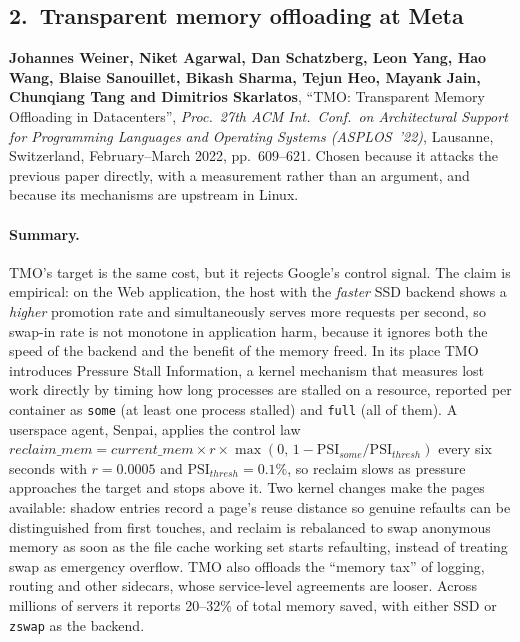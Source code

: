 \subsection*{2.~Transparent memory offloading at Meta}

\noindent\textbf{Johannes Weiner, Niket Agarwal, Dan Schatzberg, Leon Yang, Hao Wang,
Blaise Sanouillet, Bikash Sharma, Tejun Heo, Mayank Jain, Chunqiang Tang and Dimitrios
Skarlatos}, ``TMO: Transparent Memory Offloading in Datacenters'', \emph{Proc.\ 27th
ACM Int.\ Conf.\ on Architectural Support for Programming Languages and Operating
Systems (ASPLOS~'22)}, Lausanne, Switzerland, February--March 2022, pp.~609--621.
Chosen because it attacks the previous paper directly, with a measurement rather than an
argument, and because its mechanisms are upstream in Linux.

\paragraph{Summary.}
TMO's target is the same cost, but it rejects Google's control signal. The claim is
empirical: on the Web application, the host with the \emph{faster} SSD backend shows a
\emph{higher} promotion rate and simultaneously serves more requests per second, so
swap-in rate is not monotone in application harm, because it ignores both the speed of
the backend and the benefit of the memory freed. In its place TMO introduces Pressure
Stall Information, a kernel mechanism that measures lost work directly by timing how
long processes are stalled on a resource, reported per container as \texttt{some} (at
least one process stalled) and \texttt{full} (all of them). A userspace agent, Senpai,
applies the control law
$reclaim\_mem = current\_mem \times r \times \max(0,\,1-\mathrm{PSI}_{some}/
\mathrm{PSI}_{thresh})$ every six seconds with $r=0.0005$ and
$\mathrm{PSI}_{thresh}=0.1\%$, so reclaim slows as pressure approaches the target and
stops above it. Two kernel changes make the pages available: shadow entries record a
page's reuse distance so genuine refaults can be distinguished from first touches, and
reclaim is rebalanced to swap anonymous memory as soon as the file cache working set
starts refaulting, instead of treating swap as emergency overflow. TMO also offloads the
``memory tax'' of logging, routing and other sidecars, whose service-level agreements are
looser. Across millions of servers it reports 20--32\% of total memory saved, with
either SSD or \texttt{zswap} as the backend.

